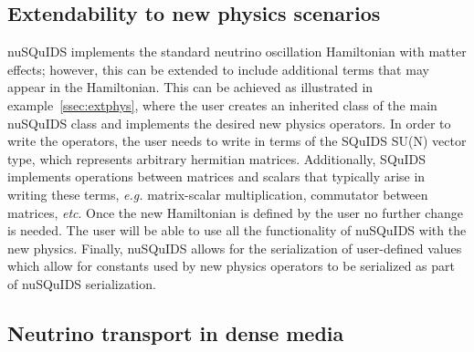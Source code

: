 \documentclass[3p,12pt]{elsarticle}
\newcommand{\ttf}{\ttfamily}
\begin{document}
\subsection{Extendability to new physics scenarios}

{\ttf nuSQuIDS} implements the standard neutrino oscillation Hamiltonian with matter effects;
however, this can be extended to include additional terms that may appear in the Hamiltonian.
This can be achieved as illustrated in example~\ref{ssec:extphys}, where the user creates an inherited class of the main {\ttf nuSQuIDS} class and implements
the desired new physics operators.
In order to write the operators, the user needs to write in terms of the {\ttf SQuIDS} SU(N) vector type, which represents arbitrary hermitian matrices.
Additionally, {\ttf SQuIDS} implements operations between matrices and scalars that typically arise in writing these terms,
\textit{e.g.} matrix-scalar multiplication, commutator between matrices, \textit{etc}.
Once the new Hamiltonian is defined by the user no further change is needed. The user will be able to use all the functionality
of {\ttf nuSQuIDS} with the new physics.
Finally, {\ttf nuSQuIDS} allows for the serialization of user-defined values which allow for constants used by new physics operators to be serialized as
part of {\ttf nuSQuIDS} serialization.

\subsection{Neutrino transport in dense media}
\end{document}
